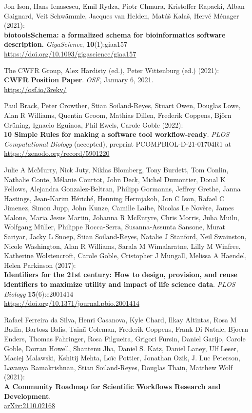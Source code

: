 \begin{thebibliography}{9}
 Jon Ison, Hans Ienasescu, Emil Rydza, Piotr Chmura, Kristoffer
Rapacki, Alban Gaignard, Veit Schwämmle, Jacques van Helden, Matúš
Kalaš, Hervé Ménager (2021):\\
\textbf{biotoolsSchema: a formalized schema for bioinformatics software
description.} \emph{GigaScience}, \textbf{10}(1):giaa157\\
\url{https://doi.org/10.1093/gigascience/giaa157}

 The CWFR Group, Alex Hardisty (ed.), Peter Wittenburg (ed.)
(2021):\\
\textbf{CWFR Position Paper}. \emph{OSF}, January 6, 2021.\\
\url{https://osf.io/3rekv/}

 Paul Brack, Peter Crowther, Stian Soiland-Reyes, Stuart Owen,
Douglas Lowe, Alan R Williams, Quentin Groom, Mathias Dillen, Frederik
Coppens, Björn Grüning, Ignacio Eguinoa, Phil Ewels, Carole Goble
(2022):\\
\textbf{10 Simple Rules for making a software tool workflow-ready}.
\emph{PLOS Computational Biology} (accepted), preprint
PCOMPBIOL-D-21-01704R1 at \url{https://zenodo.org/record/5901220}

 Julie A McMurry, Nick Juty, Niklas Blomberg, Tony Burdett, Tom
Conlin, Nathalie Conte, Mélanie Courtot, John Deck, Michel Dumontier,
Donal K Fellows, Alejandra Gonzalez-Beltran, Philipp Gormanns, Jeffrey
Grethe, Janna Hastings, Jean-Karim Hériché, Henning Hermjakob, Jon C
Ison, Rafael C Jimenez, Simon Jupp, John Kunze, Camille Laibe, Nicolas
Le Novère, James Malone, Maria Jesus Martin, Johanna R McEntyre, Chris
Morris, Juha Muilu, Wolfgang Müller, Philippe Rocca-Serra,
Susanna-Assunta Sansone, Murat Sariyar, Jacky L Snoep, Stian
Soiland-Reyes, Natalie J Stanford, Neil Swainston, Nicole Washington,
Alan R Williams, Sarala M Wimalaratne, Lilly M Winfree, Katherine
Wolstencroft, Carole Goble, Cristopher J Mungall, Melissa A Haendel,
Helen Parkinson (2017):\\
\textbf{Identifiers for the 21st century: How to design, provision, and
reuse identifiers to maximize utility and impact of life science data}.
\emph{PLOS Biology} \textbf{15}(6):e2001414\\
\url{https://doi.org/10.1371/journal.pbio.2001414}

 Rafael Ferreira da Silva, Henri Casanova, Kyle Chard, Ilkay
Altintas, Rosa M Badia, Bartosz Balis, Tainã Coleman, Frederik Coppens,
Frank Di Natale, Bjoern Enders, Thomas Fahringer, Rosa Filgueira,
Grigori Fursin, Daniel Garijo, Carole Goble, Dorran Howell, Shantenu
Jha, Daniel S. Katz, Daniel Laney, Ulf Leser, Maciej Malawski, Kshitij
Mehta, Loïc Pottier, Jonathan Ozik, J. Luc Peterson, Lavanya
Ramakrishnan, Stian Soiland-Reyes, Douglas Thain, Matthew Wolf (2021):\\
\textbf{A Community Roadmap for Scientific Workflows Research and
Development}.\\
\href{https://arxiv.org/abs/2110.02168}{arXiv:2110.02168} 


\end{thebibliography}
